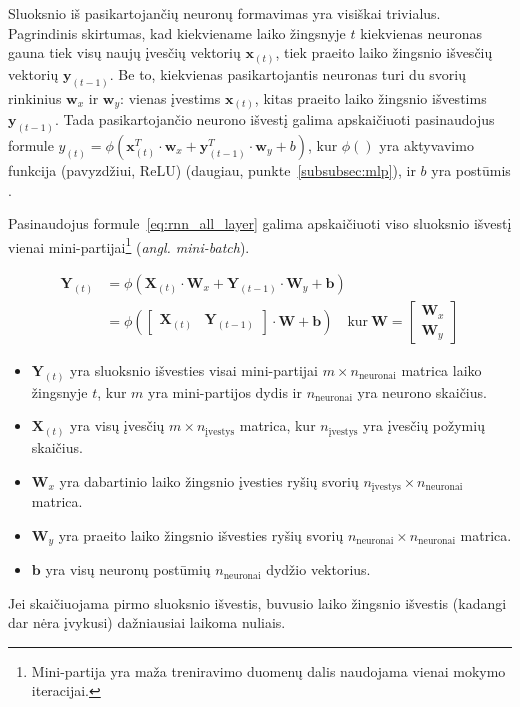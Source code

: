 \documentclass{VUMIFPSbakalaurinis}
\begin{document}
{	Sluoksnio iš pasikartojančių neuronų formavimas yra visiškai trivialus. Pagrindinis skirtumas, kad kiekviename laiko žingsnyje \(t\) kiekvienas neuronas gauna tiek visų naujų įvesčių vektorių \(\mathbf{x}_{(t)}\), tiek praeito laiko žingsnio išvesčių vektorių \(\mathbf{y}_{(t-1)}\). Be to, kiekvienas pasikartojantis neuronas turi du svorių rinkinius \(\mathbf{w}_x\) ir \(\mathbf{w}_y\): vienas įvestims \(\mathbf{x}_{(t)}\), kitas praeito laiko žingsnio išvestims \(\mathbf{y}_{(t-1)}\). Tada pasikartojančio neurono išvestį galima apskaičiuoti pasinaudojus formule \(y_{(t)} = \phi (\mathbf{x}_{(t)}^T \cdot \mathbf{w}_x + \mathbf{y}_{(t-1)}^T \cdot \mathbf{w}_y + b)\), kur \(\phi()\) yra aktyvavimo funkcija (pavyzdžiui, ReLU) (daugiau, punkte~\ref{subsubsec:mlp}), ir \(b\) yra postūmis \cite{handson}.\par
	
	Pasinaudojus formule~\ref{eq:rnn_all_layer} galima apskaičiuoti viso sluoksnio išvestį vienai mini-partijai\footnote{Mini-partija yra maža treniravimo duomenų dalis naudojama vienai mokymo iteracijai.} (\textit{angl. mini-batch}).
	
	\begin{equation}\label{eq:rnn_all_layer}
	\begin{split}
		\mathbf{Y}_{(t)} &= \phi (\mathbf{X}_{(t)} \cdot \mathbf{W}_x + \mathbf{Y}_{(t-1)} \cdot \mathbf{W}_y + \mathbf{b}) \\
		&= \phi (
		\begin{bmatrix}
			\mathbf{X}_{(t)} & \mathbf{Y}_{(t-1)}
		\end{bmatrix} 
		\cdot \mathbf{W}  + \mathbf{b}) \quad \textrm{kur} \ \mathbf{W} =
		\begin{bmatrix}
			\mathbf{W}_x \\
			\mathbf{W}_y
		\end{bmatrix}
	\end{split}
	\end{equation}

	\begin{itemize}
		\item \(\mathbf{Y}_{(t)}\) yra sluoksnio išvesties visai mini-partijai \(m \times n_{\textrm{neuronai}}\) matrica laiko žingsnyje \(t\), kur \(m\) yra mini-partijos dydis ir \(n_{\textrm{neuronai}}\) yra neurono skaičius.
		\item \(\mathbf{X}_{(t)}\) yra visų įvesčių \(m \times n_{\textrm{įvestys}}\) matrica, kur \(n_{\textrm{įvestys}}\) yra įvesčių požymių skaičius.
		\item \(\mathbf{W}_x\) yra dabartinio laiko žingsnio įvesties ryšių svorių \(n_{\textrm{įvestys}} \times n_{\textrm{neuronai}}\) matrica.
		\item \(\mathbf{W}_y\) yra praeito laiko žingsnio išvesties ryšių svorių \(n_{\textrm{neuronai}} \times n_{\textrm{neuronai}}\) matrica.
		\item \(\mathbf{b}\) yra visų neuronų postūmių \(n_{\textrm{neuronai}}\) dydžio vektorius.
	\end{itemize}\par
	Jei skaičiuojama pirmo sluoksnio išvestis, buvusio laiko žingsnio išvestis (kadangi dar nėra įvykusi) dažniausiai laikoma nuliais.\par
	
}
\end{document}
